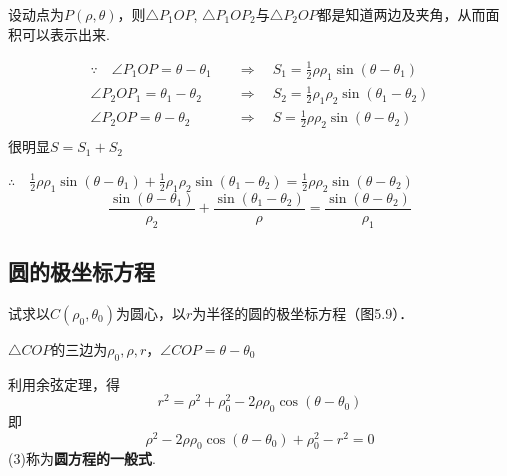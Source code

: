 \begin{analyze}
   设动点为$P(\rho,\theta)$，则$\triangle P_1OP$, $\triangle P_1OP_2$与$\triangle P_2OP$都是知道两边及夹角，从而面积可以表示出来.
\end{analyze}

\begin{solution}
\[\begin{split}
\because\quad \angle P_1OP=\theta-\theta_1\quad &\Rightarrow\quad  S_1=\frac{1}{2}\rho\rho_1\sin(\theta-\theta_1)\\
\angle P_2OP_1=\theta_1-\theta_2\quad &\Rightarrow\quad  S_2=\frac{1}{2}\rho_1\rho_2\sin(\theta_1-\theta_2)\\
\angle P_2OP=\theta-\theta_2\quad &\Rightarrow\quad  S=\frac{1}{2}\rho\rho_2\sin(\theta-\theta_2)\\
\end{split}\]
很明显$S=S_1+S_2$

$\therefore\quad \frac{1}{2}\rho\rho_1\sin(\theta-\theta_1)+\frac{1}{2}\rho_1\rho_2\sin(\theta_1-\theta_2)=\frac{1}{2}\rho\rho_2\sin(\theta-\theta_2)$
\begin{equation}
    \frac{\sin(\theta-\theta_1)}{\rho_2}+\frac{\sin(\theta_1-\theta_2)}{\rho}=\frac{\sin(\theta-\theta_2)}{\rho_1}  \tag{2}
\end{equation}
\end{solution}

\subsection{圆的极坐标方程}

\begin{example}
    试求以$C(\rho_0,\theta_0)$为圆心，以$r$为半径的圆的极坐标方程（图5.9）．
\end{example}


\noindent
\begin{minipage}{.6\textwidth}\CTEXindent
    \begin{solution}
        $\triangle COP$的三边为$\rho_0,\rho,r$，$\angle COP=\theta-\theta_0$
        
        利用余弦定理，得
        \[r^2=\rho^2+\rho^2_0-2\rho\rho_0\cos(\theta-\theta_0)\]
        即
        \begin{equation}
           \rho^2-2\rho\rho_0\cos(\theta-\theta_0)+\rho^2_0-r^2=0 \tag{3}
        \end{equation}
        (3)称为\textbf{圆方程的一般式}.
        \end{solution}
\end{minipage}
\hfill
\begin{minipage}{.38\textwidth}
\centering
{}
\end{minipage}

